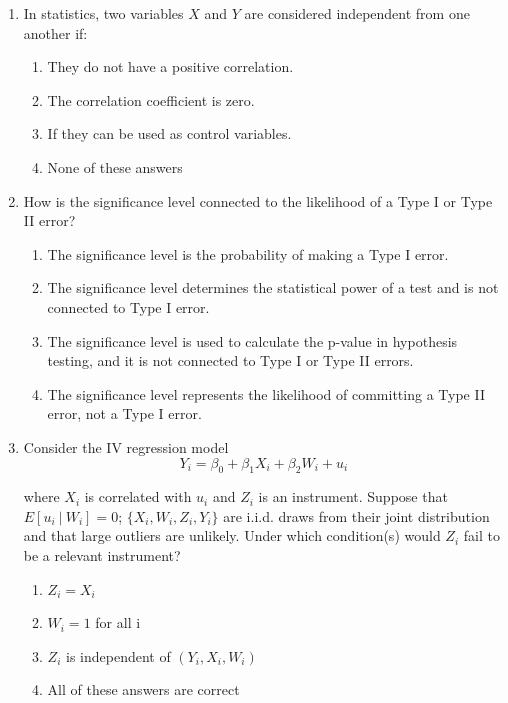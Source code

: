 \documentclass{article}
\begin{document}
\parindent

\begin{enumerate}

\item In statistics, two variables \(X\) and \(Y\) are considered independent from one another if:
    \begin{enumerate}[label=\alph*)]
        \item They do not have a positive correlation.
        \item The correlation coefficient is zero.
        \item If they can be used as control variables.
        \item None of these answers
    \end{enumerate}\vspace{.45cm}

\item How is the significance level connected to the likelihood of a Type I or Type II error?

\begin{enumerate}[label=\alph*)]
  \item The significance level is the probability of making a Type I error.
  \item The significance level determines the statistical power of a test and is not connected to Type I error.
  \item The significance level is used to calculate the p-value in hypothesis testing, and it is not connected to Type I or Type II errors.
  \item The significance level represents the likelihood of committing a Type II error, not a Type I error.
\end{enumerate}\vspace{.45cm}

\item Consider the IV regression model
\begin{equation*}
    Y_i = \beta_0 + \beta_1 X_i + \beta_2 W_i + u_i
\end{equation*}

where $X_i$ is correlated with $u_i$ and $Z_i$ is an instrument. Suppose that $E[u_i~\vert~ W_{i}] = 0$; $\{X_{i}, W_{i}, Z_{i}, Y_i\}$ are i.i.d. draws from their joint
distribution and that large outliers are unlikely. Under which condition(s) would $Z_i$ fail to be a relevant instrument?

\begin{enumerate}[label=\alph*)]
\item $Z_i = X_i$
\item $W_i = 1$ for all i
\item $Z_i$ is independent of $(Y_i, X_i, W_i)$
\item All of these answers are correct
\end{enumerate}\vspace{.4x5cm}




\end{enumerate}
\end{document}
